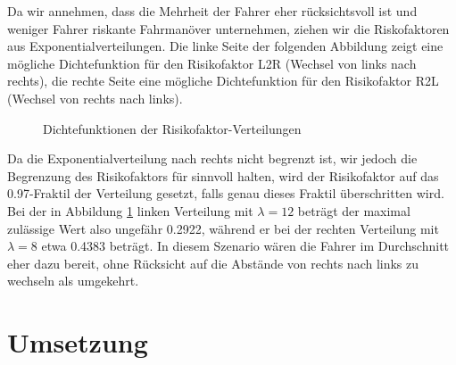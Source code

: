 \documentclass[10pt, a4paper]{article}
\begin{document}
Da wir annehmen, dass die Mehrheit der Fahrer eher rücksichtsvoll ist und weniger Fahrer riskante Fahrmanöver unternehmen, ziehen wir die Riskofaktoren aus Exponentialverteilungen. Die linke Seite der folgenden Abbildung zeigt eine mögliche Dichtefunktion für den Risikofaktor L2R (Wechsel von links nach rechts), die rechte Seite eine mögliche Dichtefunktion für den Risikofaktor R2L (Wechsel von rechts nach links).

\begin{figure}[h!]
    \centering
    \caption{Dichtefunktionen der Risikofaktor-Verteilungen}
    \label{fig:riskFactorDistributions}
\end{figure}

Da die Exponentialverteilung nach rechts nicht begrenzt ist, wir jedoch die Begrenzung des Risikofaktors für sinnvoll halten, wird der Risikofaktor auf das 0.97-Fraktil der Verteilung gesetzt, falls genau dieses Fraktil überschritten wird. Bei der in Abbildung \ref{fig:riskFactorDistributions} linken Verteilung mit $\lambda = 12$ beträgt der maximal zulässige Wert also ungefähr 0.2922, während er bei der rechten Verteilung mit $\lambda = 8$ etwa 0.4383 beträgt. In diesem Szenario wären die Fahrer im Durchschnitt eher dazu bereit, ohne Rücksicht auf die Abstände von rechts nach links zu wechseln als umgekehrt.

\section{Umsetzung}
\label{sec:umsetzung}
\end{document}
